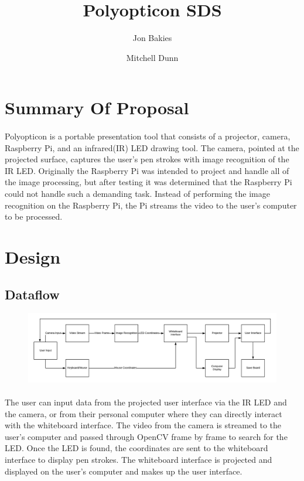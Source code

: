 \documentclass[12pt]{article}
\begin{document}
\title{Polyopticon SDS}
\author{Jon Bakies \and Mitchell Dunn} 

\maketitle
\newpage


\section{Summary Of Proposal}
\paragraph{}
Polyopticon is a portable presentation tool that consists of a projector, camera, Raspberry Pi, and an infrared(IR) LED drawing tool.
The camera, pointed at the projected surface, captures the user's pen strokes with image recognition of the IR LED.
Originally the Raspberry Pi was intended to project and handle all of the image processing, but after testing it was determined that the Raspberry Pi could not handle such a demanding task.
Instead of performing the image recognition on the Raspberry Pi, the Pi streams the video to the user's computer to be processed.

\section{Design}
\subsection{Dataflow}
\begin{figure}[ht!]
\centering
\includegraphics[width=\textwidth, height=\textheight, keepaspectratio]{Dataflow.png}
\end{figure}
\paragraph{}
The user can input data from the projected user interface via the IR LED and the camera, or from their personal computer where they can directly interact with the whiteboard interface.
The video from the camera is streamed to the user's computer and passed through OpenCV frame by frame to search for the LED.  
Once the LED is found, the coordinates are sent to the whiteboard interface to display pen strokes.
The whiteboard interface is projected and displayed on the user's computer and makes up the user interface.
\end{document}
